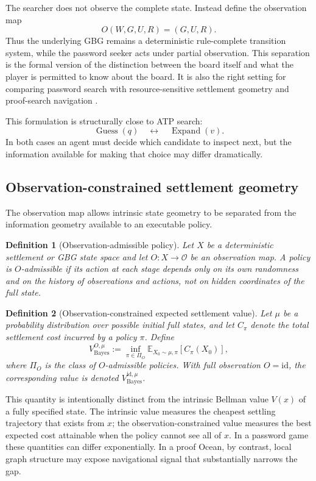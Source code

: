 \documentclass[11pt]{article}
\newtheorem{definition}{Definition}
\begin{document}
The searcher does not observe the complete state.  Instead define the
observation map
\[
O(W,G,U,R)=(G,U,R).
\]
Thus the underlying GBG remains a deterministic rule-complete transition
system, while the password seeker acts under partial observation.  This
separation is the formal version of the distinction between the board itself
and what the player is permitted to know about the board.  It is also the
right setting for comparing password search with resource-sensitive settlement
geometry and proof-search navigation \cite{tenneson-gbg,tenneson-fair}.

This formulation is structurally close to ATP search:
\[
\operatorname{Guess}(q)
\quad\leftrightarrow\quad
\operatorname{Expand}(v).
\]
In both cases an agent must decide which candidate to inspect next, but the
information available for making that choice may differ dramatically.

\subsection{Observation-constrained settlement geometry}

The observation map allows intrinsic state geometry to be separated from the
information geometry available to an executable policy.

\begin{definition}[Observation-admissible policy]
Let \(X\) be a deterministic settlement or GBG state space and let
\(O:X\to\mathcal O\) be an observation map.  A policy is
\emph{\(O\)-admissible} if its action at each stage depends only on its own
randomness and on the history of observations and actions, not on hidden
coordinates of the full state.
\end{definition}

\begin{definition}[Observation-constrained expected settlement value]
Let \(\mu\) be a probability distribution over possible initial full states,
and let \(C_\pi\) denote the total settlement cost incurred by a policy
\(\pi\).  Define
\[
V^{O,\mu}_{\mathrm{Bayes}}
:=\inf_{\pi\in\Pi_O}\mathbb E_{X_0\sim\mu,\pi}[C_\pi(X_0)],
\]
where \(\Pi_O\) is the class of \(O\)-admissible policies.  With full
observation \(O=\mathrm{id}\), the corresponding value is denoted
\(V^{\mathrm{id},\mu}_{\mathrm{Bayes}}\).
\end{definition}

This quantity is intentionally distinct from the intrinsic Bellman value
\(V(x)\) of a fully specified state.  The intrinsic value measures the cheapest
settling trajectory that exists from \(x\); the observation-constrained value
measures the best expected cost attainable when the policy cannot see all of
\(x\).  In a password game these quantities can differ exponentially.  In a
proof Ocean, by contrast, local graph structure may expose navigational signal
that substantially narrows the gap.
\end{document}
